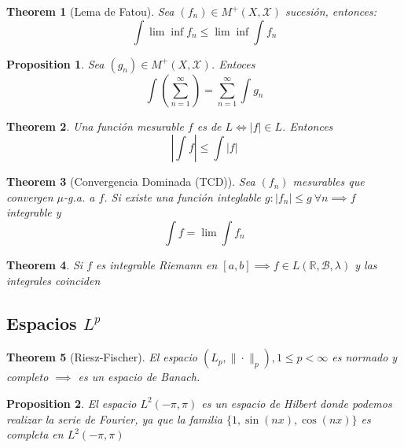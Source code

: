 \documentclass{myclass}
\newtheorem*{theorem}{Theorem}
\newtheorem*{proposition}{Proposition}
\begin{document}
\begin{theorem}[Lema de Fatou]
Sea $(f_n) \in M^+(X, \mathcal{X})$ sucesión, entonces:
\[
\int \lim \inf f_n \le \lim \inf \int f_n
\] 
\end{theorem}

\begin{proposition} Sea $(g_n) \in M^+(X, \mathcal{X})$. Entoces
  \[
 \int \left( \sum_{n=1}^\infty \right)  =\sum_{n=1}^\infty \int g_n
  \] 
\end{proposition}

\begin{theorem} Una función mesurable $f$ es de $L \iff  |f|\in L$. Entonces
  \[
|\int f|\le \int |f|  
  \] 
\end{theorem}

\begin{theorem}[Convergencia Dominada (TCD)]
Sea $(f_n)$ mesurables que convergen $\mu$-g.a. a $f$. Si existe una función integlable $g: |f_n|\le g \ \forall n \implies f$ integrable y
\[
\int f = \lim \int f_n
\] 
\end{theorem}

\begin{theorem} Si $f$ es integrable Riemann en $[a, b] \implies f\in L(\mathbb{R}, \mathcal{B}, \lambda )$ y las integrales coinciden
\end{theorem}

\subsection{Espacios $L^p$}
\begin{theorem}[Riesz-Fischer]
 El espacio $(L_p, \|\cdot \|_{p}), 1\le p <\infty$ es normado y completo $\implies$ es un espacio de Banach.
\end{theorem}


\begin{proposition}
El espacio $L^2(-\pi, \pi)$ es un espacio de Hilbert donde podemos realizar la serie de Fourier, ya que la familia $\{1, \sin(nx), \cos(nx)\}$ es completa en $L^2(-\pi, \pi)$
\end{proposition}
\end{document}
